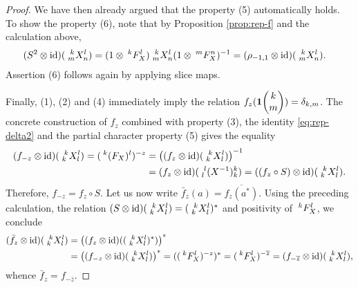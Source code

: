 \begin{proof}
We have then already argued that the property (5) automatically holds. To show the property (6), note that by Proposition \ref{prop:rep-f} and the calculation above,
    \begin{align*}
      (S^{2} \otimes \id)(\Gr{X}{k}{l}{m}{n}) &= (1
      \otimes\Gru{F_{X}}{k}{l})
      \Gr{X}{k}{l}{m}{n}(1 \otimes \Gru{F_{X}}{m}{n})^{-1} 
      =(\rho_{-1,1}  \otimes \id)(\Gr{X}{k}{l}{m}{n}).
    \end{align*}
     Assertion (6) follows again by applying slice maps.
    
     Finally, (1), (2) and (4)
     immediately imply the relation
     $f_{z}(\UnitC{k}{m})=\delta_{k,m}$. The concrete construction of $f_z$ combined with property (3), the identity \eqref{eq:rep-delta2} and the partial character property (5) gives the equality
     \begin{align*}
       (f_{-z} \otimes \id) (\Gr{X}{k}{l}{k}{l})=
       (\Gru{(F_{X})}{k}{l})^{-z} &=\left( (f_{z} \otimes
       \id)(\Gr{X}{k}{l}{k}{l})\right)^{-1} \\ &= (f_{z} \otimes
       \id)(\Gr{(X^{-1})}{l}{k}{l}{k}) = ((f_{z} \circ S) \otimes
       \id)(\Gr{X}{k}{l}{k}{l}).
     \end{align*}
Therefore, $f_{-z} = f_{z} \circ S$. Let us now write $\bar{f}_z(a) = \overline{f_z(a^*)}$. Using the preceding calculation,
     the relation $(S \otimes \id)(\Gr{X}{k}{l}{k}{l}) =
     (\Gr{X}{k}{l}{k}{l})^{*}$ and positivity of $\Gru{F_{X}}{k}{l}$,
     we conclude
     \begin{align*}
       (\bar{f}_z \otimes
       \id)(\Gr{X}{k}{l}{k}{l})
&=       \left((f_{z} \otimes
       \id)((\Gr{X}{k}{l}{k}{l})^{*})\right)^{*} \\
& = \left((f_{-z} \otimes \id)(\Gr{X}{k}{l}{k}{l})\right)^{*} 
 =
((\Gru{F_{X}}{k}{l})^{-z})^{*} 
=       (\Gru{F_{X}}{k}{l})^{-\overline{z}} = (f_{-\overline{z}}
\otimes \id)(\Gr{X}{k}{l}{k}{l}),
     \end{align*}
whence $\bar{f}_z = f_{-\overline{z}}$.
\end{proof}


